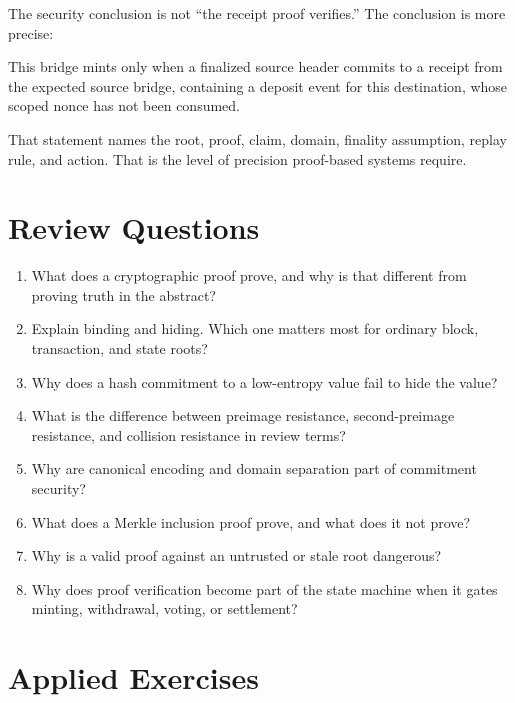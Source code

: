 The security conclusion is not ``the receipt proof verifies.'' The conclusion is more precise:

\begin{codeblock}
This bridge mints only when a finalized source header commits
to a receipt from the expected source bridge,
containing a deposit event for this destination,
whose scoped nonce has not been consumed.
\end{codeblock}

That statement names the root, proof, claim, domain, finality assumption, replay rule, and action. That is the level of precision proof-based systems require.

\section*{Review Questions}

\begin{enumerate}
\item What does a cryptographic proof prove, and why is that different from proving truth in the abstract?
\item Explain binding and hiding. Which one matters most for ordinary block, transaction, and state roots?
\item Why does a hash commitment to a low-entropy value fail to hide the value?
\item What is the difference between preimage resistance, second-preimage resistance, and collision resistance in review terms?
\item Why are canonical encoding and domain separation part of commitment security?
\item What does a Merkle inclusion proof prove, and what does it not prove?
\item Why is a valid proof against an untrusted or stale root dangerous?
\item Why does proof verification become part of the state machine when it gates minting, withdrawal, voting, or settlement?
\end{enumerate}

\section*{Applied Exercises}

